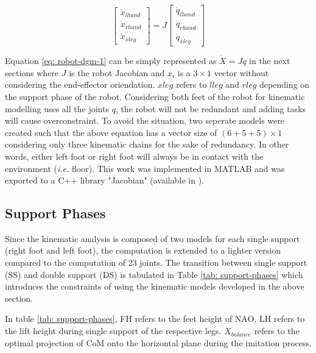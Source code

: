 \begin{equation}
    \label{eq: robot-dgm-1}
    \begin{bmatrix}
        \dot{x}_{lhand} \\ \dot{x}_{rhand} \\ \dot{x}_{xleg} 
    \end{bmatrix} = J \begin{bmatrix}
        \dot{q}_{lhand} \\ \dot{q}_{rhand} \\ \dot{q}_{xleg}
    \end{bmatrix}
\end{equation}

Equation \ref{eq: robot-dgm-1} can be simply represented as $\dot{X} = J\dot{q}$ in the next sections where $J$ is the robot Jacobian and $x_i$ is a $3 \times 1$ vector without
considering the end-effector oriendation. $xleg$ refers to $lleg$ and $rleg$ depending on the support phase of the robot. Considering both feet 
of the robot for kinematic modelling uses all the joints $q$, the robot will not be redundant and adding tasks will cause overconstraint. To avoid the situation, two seperate models
were created such that the above equation has a vector size of $(6 + 5 + 5) \times 1$ considering only three kinematic chains for the sake of redundancy. 
In other words, either left foot or right foot will always be in contact with the environment (\textit{i.e.} floor).
This work was implemented in MATLAB and was exported to a C++ library "Jacobian" (available in \cite{github}). 

\subsection{Support Phases}

Since the kinematic analysis is composed of two models for each single support (right foot and left foot), the computation is extended to a lighter version compared to the computation 
of 23 joints. The transition between single support (SS) and double support (DS) is tabulated in Table \ref{tab: support-phases} which introduces the constraints of using the kinematic models developed in the 
above section.


In table \ref{tab: support-phases}, FH refers to the feet height of NAO, LH refers to the lift height during single support of the respective legs. $X_{balance}$ refers to the optimal 
projection of CoM onto the horizontal plane during the imitation process. 

